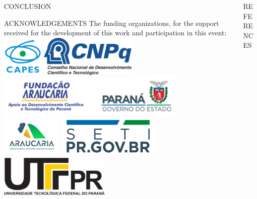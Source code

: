 \documentclass[%
  final,%
  english,%
  english,%
]{beamer}
\begin{document}
\begin{frame}[t, fragile = singleslide]
\begin{columns}[t, onlytextwidth]
\begin{column}{0.49\textwidth}
\begin{block}{CONCLUSION}
\end{block}
%
\begin{block}{ACKNOWLEDGEMENTS}
\footnotesize%
The funding organizations, for the support received for the development of this work and participation in this event:
\vfill%
\includegraphics[height = 20mm]{./Logos/apoio-capes}
\hspace*{5mm}
\includegraphics[height = 20mm]{./Logos/apoio-cnpq}
\hspace*{5mm}
\includegraphics[height = 20mm]{./Logos/apoio-fa-gov-pr}
\hspace*{5mm}
\includegraphics[height = 20mm]{./Logos/fa}
\hspace*{5mm}
\includegraphics[height = 20mm]{./Logos/seti}
\hspace*{5mm}
\includegraphics[height = 20mm]{./Logos/utfpr}
\end{block}
%
\end{column}
%
\begin{column}{0.49\textwidth}
%
\begin{block}{REFERENCES}
\printbibliography[heading = none]
\end{block}
%
\end{column}
%
\end{columns}


\end{frame}
\end{document}
